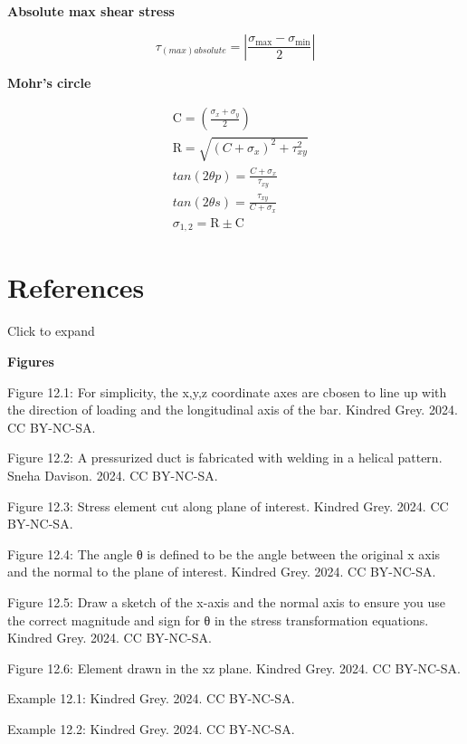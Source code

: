 \documentclass[
  letterpaper,
  DIV=11,
  numbers=noendperiod]{scrreprt}
\theoremstyle{definition}
\theoremstyle{remark}
\begin{document}
\begin{tcolorbox}
\textbf{Absolute max shear stress}

\[
\tau_{(max)absolute}=\left|\frac{\sigma_{\max }-\sigma_{\min }}{2}\right|
\]

\textbf{Mohr's circle}

\[
\begin{aligned}
& \mathrm{C}=\left(\frac{\sigma_x+\sigma_y}{2}\right) \\
& \mathrm{R}=\sqrt{\left(C+\sigma_x\right)^2+\tau_{x y}^2} \\
& tan(2 \theta p)=\frac{C+\sigma_x}{\tau_{x y}} \\
& tan(2 \theta s)=\frac{\tau_{x y}}{C+\sigma_x} \\
& \sigma_{1,2}=\mathrm{R} \pm \mathrm{C}
\end{aligned}
\]

\end{tcolorbox}

\section*{References}\label{references-11}


Click to expand

\textbf{Figures}

Figure 12.1: For simplicity, the x,y,z coordinate axes are cbosen to
line up with the direction of loading and the longitudinal axis of the
bar. Kindred Grey. 2024. CC BY-NC-SA.

Figure 12.2: A pressurized duct is fabricated with welding in a helical
pattern. Sneha Davison. 2024. CC BY-NC-SA.

Figure 12.3: Stress element cut along plane of interest. Kindred Grey.
2024. CC BY-NC-SA.

Figure 12.4: The angle θ is defined to be the angle between the original
x axis and the normal to the plane of interest. Kindred Grey. 2024. CC
BY-NC-SA.

Figure 12.5: Draw a sketch of the x-axis and the normal axis to ensure
you use the correct magnitude and sign for θ in the stress
transformation equations. Kindred Grey. 2024. CC BY-NC-SA.

Figure 12.6: Element drawn in the xz plane. Kindred Grey. 2024. CC
BY-NC-SA.

Example 12.1: Kindred Grey. 2024. CC BY-NC-SA.

Example 12.2: Kindred Grey. 2024. CC BY-NC-SA.
\end{document}
